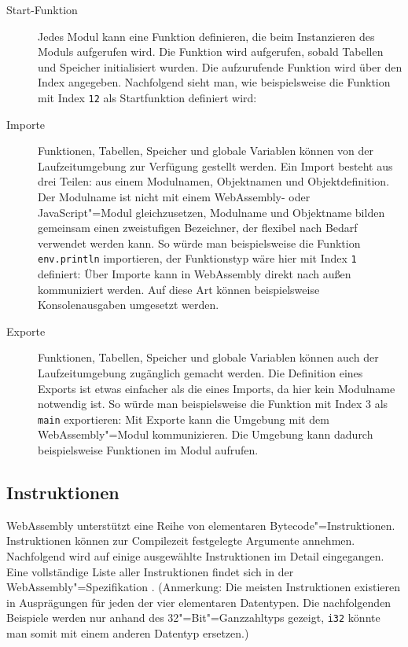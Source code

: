 \begin{description}
    \item[Start-Funktion] Jedes Modul kann eine Funktion definieren, die beim Instanzieren des Moduls aufgerufen wird. Die Funktion wird aufgerufen, sobald Tabellen und Speicher initialisiert wurden. Die aufzurufende Funktion wird über den Index angegeben. Nachfolgend sieht man, wie beispielsweise die Funktion mit Index \lstinline{12} als Startfunktion definiert wird: 
    \item[Importe] Funktionen, Tabellen, Speicher und globale Variablen können von der Laufzeitumgebung zur Verfügung gestellt werden. Ein Import besteht aus drei Teilen: aus einem Modulnamen, Objektnamen und Objektdefinition. Der Modulname ist nicht mit einem WebAssembly- oder JavaScript"=Modul gleichzusetzen, Modulname und Objektname bilden gemeinsam einen zweistufigen Bezeichner, der flexibel nach Bedarf verwendet werden kann. So würde man beispielsweise die Funktion \lstinline{env.println} importieren, der Funktionstyp wäre hier mit Index \lstinline{1} definiert: 
    Über Importe kann in WebAssembly direkt nach außen kommuniziert werden. Auf diese Art können beispielsweise Konsolenausgaben umgesetzt werden.
    \item[Exporte] Funktionen, Tabellen, Speicher und globale Variablen können auch der Laufzeitumgebung zugänglich gemacht werden. Die Definition eines Exports ist etwas einfacher als die eines Imports, da hier kein Modulname notwendig ist. So würde man beispielsweise die Funktion mit Index 3 als \lstinline{main} exportieren: 
    Mit Exporte kann die Umgebung mit dem WebAssembly"=Modul kommunizieren. Die Umgebung kann dadurch beispielsweise Funktionen im Modul aufrufen.
\end{description}

\subsection{Instruktionen}
\label{subsec:WebAssembly-Instruktionen}
WebAssembly unterstützt eine Reihe von elementaren Bytecode"=Instruktionen. Instruktionen können zur Compilezeit festgelegte Argumente annehmen. Nachfolgend wird auf einige ausgewählte Instruktionen im Detail eingegangen. Eine vollständige Liste aller Instruktionen findet sich in der WebAssembly"=Spezifikation \cite{WebAssemblySpecification}. (Anmerkung: Die meisten Instruktionen existieren in Ausprägungen für jeden der vier elementaren Datentypen. Die nachfolgenden Beispiele werden nur anhand des 32"=Bit"=Ganzzahltyps gezeigt, \lstinline{i32} könnte man somit mit einem anderen Datentyp ersetzen.)


